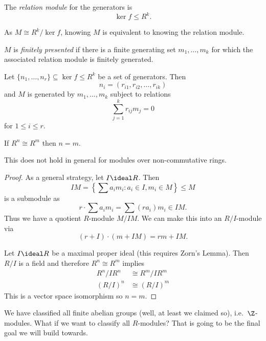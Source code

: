 \documentclass[a4paper]{article}
\theoremstyle{definition}
\begin{document}
\begin{definition}
  The \emph{relation module} for the generators is
  \[
    \ker f \leq R^k.
  \]
\end{definition}

As \(M \cong R^k/\ker f\), knowing \(M\) is equivalent to knowing the relation module.

\begin{definition}
  \(M\) is \emph{finitely presented} if there is a finite generating set \(m_1, \dots, m_k\) for which the associated relation module is finitely generated.
\end{definition}

Let \(\{n_1, \dots, n_r\} \subseteq \ker f \leq R^k\) be a set of generators. Then
\[
  n_i = (r_{i1}, r_{i2}, \dots, r_{ik})
\]
and \(M\) is generated by \(m_1, \dots, m_k\) subject to relations
\[
  \sum_{j = 1}^k r_{ij} m_j = 0
\]
for \(1 \leq i\leq r\).

\begin{proposition}
  If \(R^n \cong R^m\) then \(n = m\).
\end{proposition}

\begin{note}
  This does not hold in general for modules over non-commutative rings.
\end{note}

\begin{proof}
  As a general strategy, let \(I \ideal R\). Then
  \[
    IM = \left\{\sum a_im_i: a_i \in I, m_i \in M \right\} \leq M
  \]
  is a submodule as
  \[
    r \cdot \sum a_im_i = \sum (ra_i)m_i \in IM.
  \]
  Thus we have a quotient \(R\)-module \(M/IM\). We can make this into an \(R/I\)-module via
  \[
    (r + I) \cdot (m + IM) = rm + IM.
  \]

  Let \(I \ideal R\) be a maximal proper ideal (this requires Zorn's Lemma). Then \(R/I\) is a field and therefore \(R^n \cong R^m\) implies
  \begin{align*}
    R^n/IR^n &\cong R^m/IR^m \\
    (R/I)^n &\cong (R/I)^m
  \end{align*}
  This is a vector space isomorphism so \(n = m\).
\end{proof}

We have classified all finite abelian groups (well, at least we claimed so), i.e.\ \(\Z\)-modules. What if we want to classify all \(R\)-modules? That is going to be the final goal we will build towards.
\end{document}
